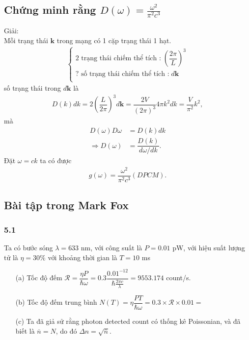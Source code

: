 \documentclass{article}
\newcommand{\f}[2]{\dfrac{#1}{#2}}
\begin{document}
\subsection*{Chứng minh rằng $D(\omega) = \frac{\omega^2}{\pi^2 c^3}$}
Giải:\\
Mỗi trạng thái $\mathbf{k}$ trong mạng có 1 cặp trạng thái 1 hạt.
\begin{align*}
	\begin{cases}
		\text{2 trạng thái chiếm thể tích :} \; \left(\f{2\pi}{L}\right)^3 \\
		\text{? số trạng thái chiếm thể tích :} \; d\mathbf{k}             \\
	\end{cases}
\end{align*}
số trạng thái trong $d\mathbf{k}$ là
\begin{align*}
	D(k)dk = 2  \left(\f{L}{2\pi}\right)^3 d\mathbf{k} = \f{2V}{(2\pi)^3} 4\pi k^2 dk = \f{V}{\pi^2}k^2,
\end{align*}
mà
\begin{align*}
	D(\omega) D\omega     & = D(k) dk                 \\
	\Rightarrow D(\omega) & = \f{D(k)}{d\omega / dk}.
\end{align*}
Đặt $\omega = ck$ ta có được
\begin{align*}
	g(\omega) = \f{\omega^2}{\pi^2 c^3} (DPCM).
\end{align*}

\subsection*{Bài tập trong Mark Fox}
\subsubsection*{5.1}
Ta có bước sóng $\lambda = 633$ nm, với công suất là $P = 0.01$ pW, với hiệu suất lượng tử là $\eta = 30\% $ với khoảng thời gian là $T = 10$ ms
\begin{enumerate}
	\item[(a)] Tốc độ đếm $\mathcal{R} = \f{\eta P}{\hbar \omega} = 0.3 \f{0.01^{-12}}{\hbar \frac{2\pi c}{\lambda}} = 9553.174$ count/s.
	\item[(b)] Tốc độ đếm trung bình $N(T)= \eta \f{PT}{\hbar \omega} = 0.3 \times \mathcal{R}\times 0.01 =$
	\item[(c)] Ta đã giả sử rằng photon detected count có thống kê Poissonian, và đã biết là $\overline{n} = N$, do đó $\Delta n = \sqrt{\overline{n}}$.
\end{enumerate}
\end{document}
